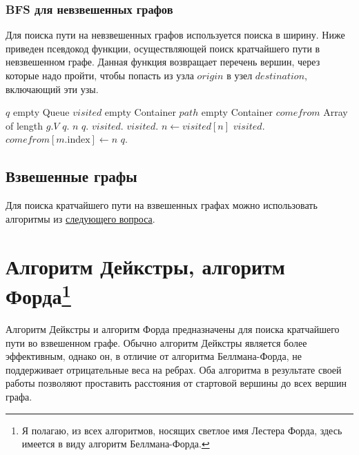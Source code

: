 \subsubsection{BFS для невзвешенных графов}
Для поиска пути на невзвешенных графов используется поиска в ширину. Ниже приведен псевдокод функции,
осуществляющей поиск кратчайшего пути в невзвешенном графе. Данная функция возвращает перечень вершин,
через которые надо пройти, чтобы попасть из узла $origin$ в узел $destination$, включающий эти узы.
\begin{algorithmic}
  \State $q$ \asgn empty Queue
  \State $visited$ \asgn empty Container
  \State $path$ \asgn empty Container
  \State $comefrom$ \asgn Array of length $g.V$
  \State $q$.
    \State $n$ \asgn $q$.
    \State $visited$.
      \State $visited$.
        \State $n \gets visited[n]$
        \State $visited$.
      \EndWhile
      \State {}
    \EndIf
        \State $comefrom[m.\text{index}] \gets n$
        \State $q$.
      \EndIf
    \EndFor
  \EndWhile
  \State {} 
\EndFunction
\end{algorithmic}

\subsection{Взвешенные графы}
Для поиска кратчайшего пути на взвешенных графах можно использовать алгоритмы из
\hyperref[sec:dijkstra_ford]{следующего вопроса}.

\section{Алгоритм Дейкстры, алгоритм Форда\footnote{Я полагаю, из всех алгоритмов,
носящих светлое имя Лестера Форда, здесь имеется в виду алгоритм Беллмана-Форда.}}
\label{sec:dijkstra_ford}
Алгоритм Дейкстры и алгоритм Форда предназначены
для поиска кратчайшего пути во взвешенном графе.
Обычно алгоритм Дейкстры является более эффективным, однако он,
в отличие от алгоритма Беллмана-Форда, не поддерживает отрицательные
веса на ребрах. Оба алгоритма в результате своей работы позволяют проставить
расстояния от стартовой вершины до всех вершин графа.

